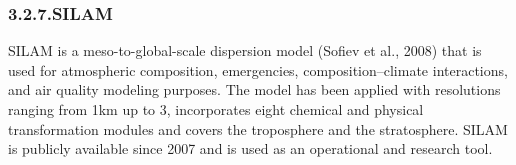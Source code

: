 \documentclass[9pt]{article}
\begin{document}
\begin{table}[h!]%
\begin{mdcenter}%
{}%
\end{mdcenter}\label{mocage-portfolio}%
\end{table}%

\subsubsection{3.2.7.\hspace*{0.5em}SILAM}\label{sec-silam}%

\noindent{}SILAM is a meso-to-global-scale dispersion model (Sofiev et al., 2008) that is used for atmospheric composition, emergencies, composition–climate interactions, and air quality modeling purposes. 
The model has been applied with resolutions ranging from 1km up to 3\textdegree{}, incorporates eight chemical and physical transformation modules and covers the troposphere and the stratosphere. 
SILAM is publicly available since 2007 and is used as an operational and research tool.%
\end{document}
